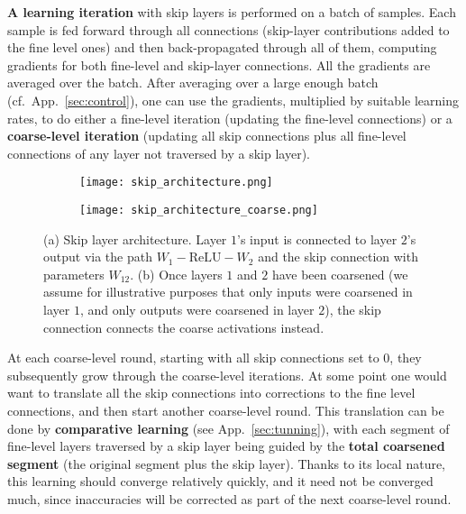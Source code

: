 \documentclass{article} %
\begin{document}
\textbf{A learning iteration} with skip layers is performed on a batch of samples. Each sample is fed forward through all connections (skip-layer contributions added to the fine level ones) and then back-propagated through all of them, computing gradients for both fine-level and skip-layer connections. All the gradients are averaged over the batch. After averaging over a large enough batch (cf.~App.~\ref{sec:control}), one can use the gradients, multiplied by suitable learning rates, to do either a fine-level iteration (updating the fine-level connections) or a \textbf{coarse-level iteration} (updating all  skip connections plus all fine-level connections of any layer not traversed by a skip layer).
\begin{figure}[htbp]
\centering
\begin{subfigure}[b]{0.55\textwidth}
  \texttt{[image: skip\_architecture.png]}
   \caption{}
   \label{fig:skip_architecture} 
\end{subfigure}

\begin{subfigure}[b]{0.55\textwidth}
  \texttt{[image: skip\_architecture\_coarse.png]}
   \caption{}
   \label{fig:skip_architecture_coarse}
\end{subfigure}
\caption[Skip layer architecture.]{(a) Skip layer architecture. Layer $1$'s input is connected to layer $2$'s output via the path $W_1-{\mbox{ReLU}}-W_2$ and the skip connection with parameters $W_{12}$. (b) Once layers $1$ and $2$ have been coarsened (we assume for illustrative purposes that only inputs were coarsened in layer $1$, and only outputs were coarsened in layer $2$), the skip connection connects the coarse activations instead.}
\end{figure}

At each coarse-level round, starting with all skip connections set to $0$, they subsequently grow through the coarse-level iterations. At some point one would want to translate all the skip connections into corrections to the fine level connections, and then start another coarse-level round. This translation can be done by \textbf{comparative learning} (see App.~\ref{sec:tunning}), with each segment of fine-level layers traversed by a skip layer being guided by the \textbf{total coarsened segment} (the original segment plus the skip layer). Thanks to its local nature, this learning should converge relatively quickly, and it need not be converged much, since inaccuracies will be corrected as part of the next coarse-level round.
\end{document}

